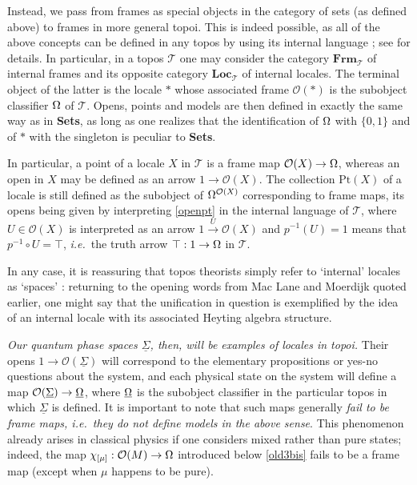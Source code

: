 \documentclass[12pt]{article}
\newcommand{\Sets}{\mbox{\textbf{Sets}}}
\newcommand{\raw}{\rightarrow} \newcommand{\rat}{\mapsto}
\newcommand{\inv}{^{-1}}
\newcommand{\er}{\eqref}
\newcommand{\ch}{\chi} \newcommand{\ps}{\psi} \newcommand{\Ps}{\Psi}
\newcommand{\CO}{{\mathcal O}} \newcommand{\CP}{{\mathcal P}}
\newcommand{\CT}{{\mathcal T}} \newcommand{\CV}{{\mathcal V}}
\newcommand{\functor}[1]{\ensuremath{\underline{#1}}}
\newcommand{\ie}{\textit{i.e.}}
\newcommand{\ulS}{\functor{\Sigma}}
\begin{document}
 Instead, we
 pass from frames as special objects in the category of sets (as defined above)
to frames in more general topoi. This is indeed possible, as all of the above
concepts
 can be defined in any topos by using its internal
 language \cite{maclanemoerdijk92}; see \cite{borceux3} for details. In
particular,
 in a topos $\CT$ one may consider the category $\mathbf{Frm}_{\CT}$ of internal
frames
 and its opposite category $\mathbf{Loc}_{\CT}$ of internal locales. The
terminal object of the latter is the locale $*$ whose associated frame $\CO(*)$
is the subobject classifier $\Omega$ of $\CT$. Opens, points and models are then
defined in exactly the same way as in \Sets, as long as one realizes that the
identification of $\Omega$ with $\{0,1\}$ and of $*$ with the singleton
 is peculiar to \Sets.

In particular, a point of a locale $X$ in $\CT$ is a frame map $\CO(X)\raw\Om$,
whereas an open in $X$ may be defined as an arrow $1\raw \CO(X)$.
 The collection $\mathrm{Pt}(X)$ of a locale is still defined as the subobject
of
$\Om^{\CO(X)}$ corresponding to frame maps, its opens being given by
interpreting \er{openpt} in the internal language of $\CT$, where $U\in \CO(X)$
is interpreted as an arrow $1\stackrel{U}{\raw}\CO(X)$
and $p\inv(U)=1$ means that $p\inv \circ U=\top$, \ie\ the truth arrow
$\top:1\raw\Om$ in $\CT$.

In any case, it is reassuring that topos theorists simply refer to `internal'
locales as `spaces' \cite{joyalmoerdijk90, joyaltierney84,moerdijk84}: returning
to the opening words
from Mac Lane and Moerdijk quoted earlier, one might say that the unification in
question
is exemplified by the idea of an internal locale with its associated Heyting
algebra structure.

{\it Our quantum phase spaces $\ulS$, then, will be examples of locales in
topoi.}
Their opens $1\raw \CO(\ulS)$ will correspond to the elementary propositions or
yes-no questions about the system, and each physical state on the system will
define a map
$\CO(\ulS)\raw \underline{\Om}$, where $\underline{\Omega}$ is the subobject
classifier in the particular topos in which $\ulS$ is defined.
It is important to note that such maps generally {\it  fail to be
frame maps, \ie\ they do not define models in the above sense}.
This phenomenon already arises in classical physics if one considers mixed
rather than pure states; indeed, the map
$\ch_{[\mu]}:\CO(M)\raw\Om$ introduced below \er{old3bis} fails to be a frame
map (except when $\mu$ happens to be pure).
\end{document}
